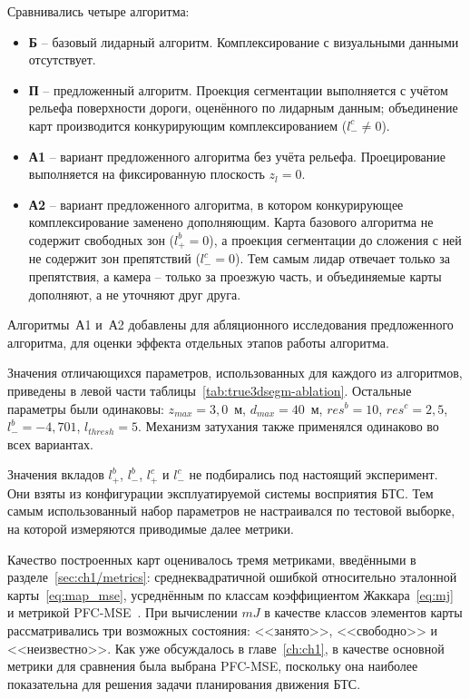 Сравнивались четыре алгоритма:

\begin{itemize}
	\item \textbf{Б} -- базовый лидарный алгоритм. Комплексирование с визуальными данными отсутствует.
	\item \textbf{П} -- предложенный алгоритм. Проекция сегментации выполняется с учётом рельефа поверхности дороги, оценённого по лидарным данным; объединение карт производится конкурирующим комплексированием ($l^c_- \neq 0$).
	\item \textbf{А1} -- вариант предложенного алгоритма без учёта рельефа. Проецирование выполняется на фиксированную плоскость $z_l = 0$.
	\item \textbf{А2} -- вариант предложенного алгоритма, в котором конкурирующее комплексирование заменено дополняющим. Карта базового алгоритма не содержит свободных зон ($l^b_+ = 0$), а проекция сегментации до сложения с ней не содержит зон препятствий ($l^c_- = 0$). Тем самым лидар отвечает только за препятствия, а камера -- только за проезжую часть, и объединяемые карты дополняют, а не уточняют друг друга.
\end{itemize}

Алгоритмы~А1 и~А2 добавлены для абляционного исследования предложенного алгоритма, для оценки эффекта отдельных этапов работы алгоритма.

Значения отличающихся параметров, использованных для каждого из алгоритмов, приведены в левой части таблицы~\cref{tab:true3dsegm-ablation}. Остальные параметры были одинаковы: $z_{max} = 3,0$~м, $d_{max} = 40$~м, $res^b = 10$, $res^c = 2,5$, $l^b_- = -4,701$, $l_{thresh} = 5$. Механизм затухания также применялся одинаково во всех вариантах.

Значения вкладов $l^b_+$, $l^b_-$, $l^c_+$ и $l^c_-$ не подбирались под настоящий эксперимент. Они взяты из конфигурации эксплуатируемой системы восприятия БТС. Тем самым использованный набор параметров не настраивался по тестовой выборке, на которой измеряются приводимые далее метрики.

Качество построенных карт оценивалось тремя метриками, введёнными в разделе~\cref{sec:ch1/metrics}: среднеквадратичной ошибкой относительно эталонной карты~\cref{eq:map_mse}, усреднённым по классам коэффициентом Жаккара~\cref{eq:mj} и метрикой PFC-MSE~\cite{horel2023navigation}. При вычислении $mJ$ в качестве классов элементов карты рассматривались три возможных состояния: <<занято>>, <<свободно>> и <<неизвестно>>. Как уже обсуждалось в главе~\cref{ch:ch1}, в качестве основной метрики для сравнения была выбрана PFC-MSE, поскольку она наиболее показательна для решения задачи планирования движения БТС.

